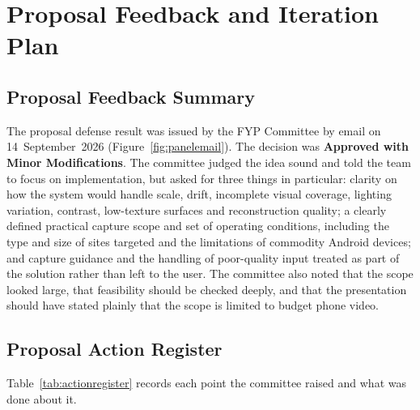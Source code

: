 \chapter{Proposal Feedback and Iteration Plan}

\section{Proposal Feedback Summary}
The proposal defense result was issued by the FYP Committee by email on 14~September~2026 (Figure~\ref{fig:panelemail}). The decision was \textbf{Approved with Minor Modifications}. The committee judged the idea sound and told the team to focus on implementation, but asked for three things in particular: clarity on how the system would handle scale, drift, incomplete visual coverage, lighting variation, contrast, low-texture surfaces and reconstruction quality; a clearly defined practical capture scope and set of operating conditions, including the type and size of sites targeted and the limitations of commodity Android devices; and capture guidance and the handling of poor-quality input treated as part of the solution rather than left to the user. The committee also noted that the scope looked large, that feasibility should be checked deeply, and that the presentation should have stated plainly that the scope is limited to budget phone video.
\section{Proposal Action Register}
\label{sec:actionregister}
Table~\ref{tab:actionregister} records each point the committee raised and what was done about it.

